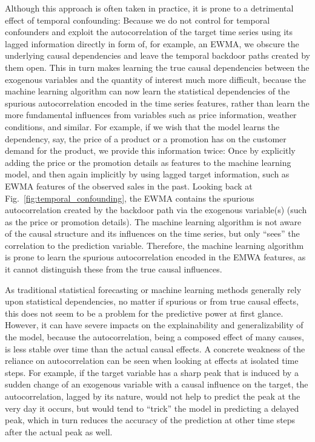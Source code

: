 \documentclass[BCOR=1mm, DIV=calc,10pt,
twoside=true,
twocolumn,
headings=normal]{scrartcl}
\newcommand{\fig}{Fig.~}
\begin{document}
Although this approach is often taken in practice, it is prone to a detrimental effect of temporal confounding: Because we do not control for temporal confounders and exploit the autocorrelation of the target time series using its lagged information directly in form of, for example, an EWMA, we obscure the underlying causal dependencies and leave the temporal backdoor paths created by them open. This in turn makes learning the true causal dependencies between the exogenous variables and the quantity of interest much more difficult, because the machine learning algorithm can now learn the statistical dependencies of the spurious autocorrelation encoded in the time series features, rather than learn the more fundamental influences from variables such as price information, weather conditions, and similar. For example, if we wish that the model learns the dependency, say, the price of a product or a promotion has on the customer demand for the product, we provide this information twice: Once by explicitly adding the price or the promotion details as features to the machine learning model, and then again implicitly by using lagged target information, such as EWMA features of the observed sales in the past. Looking back at \fig \ref{fig:temporal_confounding}, the EWMA contains the spurious autocorrelation created by the backdoor path via the exogenous variable(s) (such as the price or promotion details). The machine learning algorithm is not aware of the causal structure and its influences on the time series, but only ``sees'' the correlation to the prediction variable. Therefore, the machine learning algorithm is prone to learn the spurious autocorrelation encoded in the EMWA features, as it cannot distinguish these from the true causal influences.

As traditional statistical forecasting or machine learning methods generally rely upon statistical dependencies, no matter if spurious or from true causal effects, this does not seem to be a problem for the predictive power at first glance. However, it can have severe impacts on the explainability and generalizability of the model, because the autocorrelation, being a composed effect of many causes, is less stable over time than the actual causal effects. A concrete weakness of the reliance on autocorrelation can be seen when looking at effects at isolated time steps. For example, if the target variable has a sharp peak that is induced by a sudden change of an exogenous variable with a causal influence on the target, the autocorrelation, lagged by its nature, would not help to predict the peak at the very day it occurs, but would tend to ``trick'' the model in predicting a delayed peak, which in turn reduces the accuracy of the prediction at other time steps after the actual peak as well.
\end{document}
